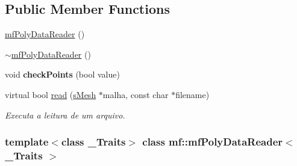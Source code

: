 \subsection*{Public Member Functions}
\begin{DoxyCompactItemize}
\item 
\hyperlink{classmf_1_1mfPolyDataReader_a5179b5d325985e2ee3d51c05e1434e67}{mfPolyDataReader} ()
\item 
\hyperlink{classmf_1_1mfPolyDataReader_a6c7cb050280ccbf0700e40a1a4d54b84}{$\sim$mfPolyDataReader} ()
\item 
\hypertarget{classmf_1_1mfPolyDataReader_ab2857fae25ff16cfe8b621e6d89395b6}{
void {\bfseries checkPoints} (bool value)}
\label{classmf_1_1mfPolyDataReader_ab2857fae25ff16cfe8b621e6d89395b6}

\item 
virtual bool \hyperlink{classmf_1_1mfPolyDataReader_a2c013ff82158ddc91ab451257a3051d0}{read} (\hyperlink{classmf_1_1mfPolyDataReader_a5343a659b464b89fc0c8b58ee56ed568}{sMesh} $\ast$malha, const char $\ast$filename)
\begin{DoxyCompactList}\small\item\em Executa a leitura de um arquivo. \item\end{DoxyCompactList}\end{DoxyCompactItemize}
\subsubsection*{template$<$class \_\-Traits$>$ class mf::mfPolyDataReader$<$ \_\-Traits $>$}



